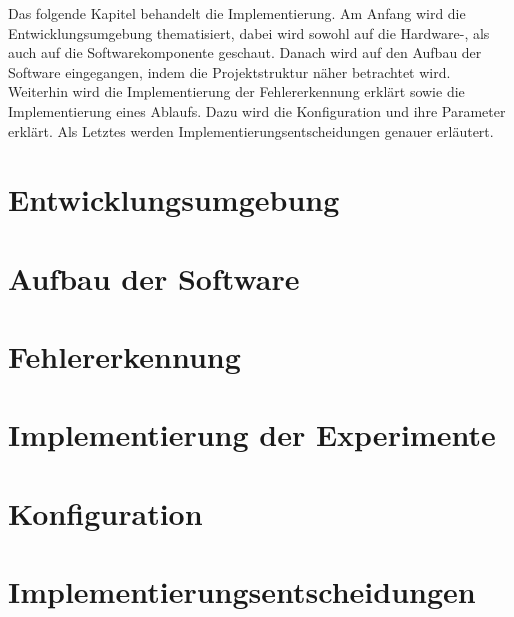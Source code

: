 
Das folgende Kapitel behandelt die Implementierung.
Am Anfang wird die Entwicklungsumgebung thematisiert, dabei wird sowohl auf die Hardware-, als auch auf die
Softwarekomponente geschaut.
Danach wird auf den Aufbau der Software eingegangen, indem die Projektstruktur näher betrachtet wird.
Weiterhin wird die Implementierung der Fehlererkennung erklärt sowie die Implementierung eines Ablaufs.
Dazu wird die Konfiguration und ihre Parameter erklärt.
Als Letztes werden Implementierungsentscheidungen genauer erläutert.

\section{Entwicklungsumgebung}
\label{sec:devenv}


\section{Aufbau der Software}
\label{sec:softwareDesign}


\section{Fehlererkennung}
\label{sec:errorDetection}


\section{Implementierung der Experimente}
\label{sec:experimentImpl}


\section{Konfiguration}
\label{sec:configuration}


\section{Implementierungsentscheidungen}
\label{sec:decisions}
